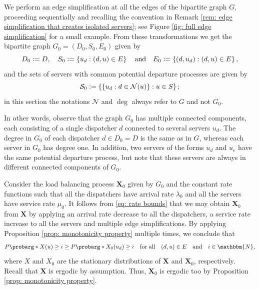 \documentclass[a4paper, 12pt]{article}
\theoremstyle{definition}
\newcommand{\set}[2]{\left\{#1 : #2\right\}}
\newcommand{\defeq}{\vcentcolon=}
\newcommand{\bX}{\boldsymbol{X}}
\newcommand{\calN}{\mathcal{N}}
\newcommand{\calS}{\mathcal{S}}
\newcommand{\N}{\mathbbm{N}}
\newcommand{\cprob}{P\probarg}
\begin{document}
We perform an edge simplification at all the edges of the bipartite graph $G$, proceeding sequentially and recalling the convention in Remark \ref{rem: edge simplification that creates isolated servers}; see Figure \ref{fig: full edge simplification} for a small example. From these transformations we get the bipartite graph $G_0 = (D_0, S_0, E_0)$ given by
\begin{equation*}
D_0 \defeq D, \quad S_0 \defeq \set{u_d}{(d, u) \in E} \quad \text{and} \quad E_0 \defeq \set{(d, u_d)}{(d, u) \in E},
\end{equation*}
and the sets of servers with common potential departure processes are given by
\begin{equation*}
	\calS_0 \defeq \set{\set{u_d}{d \in \calN(u)}}{u \in S};
\end{equation*}
in this section the notations $\calN$ and $\deg$ always refer to $G$ and not $G_0$.

In other words, observe that the graph $G_0$ has multiple connected components, each consisting of a single dispatcher $d$ connected to several servers $u_d$. The degree in $G_0$ of each dispatcher $d \in D_0 = D$ is the same as in $G$, whereas each server in $G_0$ has degree one. In addition, two servers of the forms $u_d$ and $u_e$ have the same potential departure process, but note that these servers are always in different connected components of $G_0$.

Consider the load balancing process $\bX_0$ given by $G_0$ and the constant rate functions such that all the dispatchers have arrival rate $\lambda_0$ and all the servers have service rate $\mu_0$. It follows from \eqref{eq: rate bounds} that we may obtain $\bX_0$ from $\bX$ by applying an arrival rate decrease to all the dispatchers, a service rate increase to all the servers and multiple edge simplifications. By applying Proposition \ref{prop: monotonicity property} multiple times, we conclude that
\begin{equation}
	\label{eq: stochastic dominance after full edge simplification}
	\cprob*{X(u) \geq i} \geq \cprob*{X_0(u_d) \geq i} \quad \text{for all} \quad (d, u) \in E \quad \text{and} \quad i \in \N,
\end{equation}
where $X$ and $X_0$ are the stationary distributions of $\bX$ and $\bX_0$, respectively. Recall that $\bX$ is ergodic by assumption. Thus, $\bX_0$ is ergodic too by Proposition \ref{prop: monotonicity property}.
\end{document}
